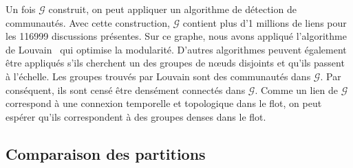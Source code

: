 Un fois $\mathcal{G}$ construit, on peut appliquer un algorithme de détection de communautés.
Avec cette construction, $\mathcal{G}$  contient plus d'1 millions de liens pour les 116999 discussions présentes.
Sur ce graphe, nous avons appliqué l'algorithme de Louvain~\cite{Blondel2008a} qui optimise la modularité.
D'autres algorithmes peuvent également être appliqués s'ils cherchent un des groupes de n\oe uds disjoints et qu'ils passent à l'échelle.
Les groupes trouvés par Louvain sont des communautés dans $\mathcal{G}$.
Par conséquent, ils sont censé être densément connectés dans $\mathcal{G}$.
Comme un lien de $\mathcal{G}$ correspond à une connexion temporelle et topologique dans le flot, on peut espérer qu'ils correspondent à des groupes denses dans le flot.

\subsection{Comparaison des partitions}

